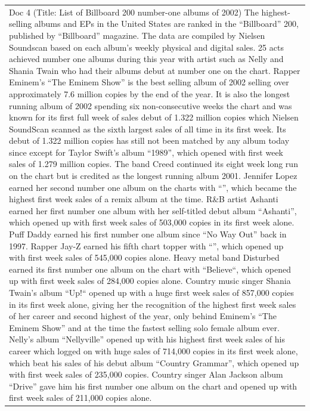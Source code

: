 \documentclass[11pt]{article}
\begin{document}
\begin{longtable}{|p{}|}
Doc 4 (Title: List of Billboard 200 number-one albums of 2002) The highest-selling albums and EPs in the United States are ranked in the ``Billboard'' 200, published by ``Billboard'' magazine. The data are compiled by Nielsen Soundscan based on each album's weekly physical and digital sales. 25 acts achieved number one albums during this year with artist such as Nelly and Shania Twain who had their albums debut at number one on the chart. Rapper Eminem's ``The Eminem Show'' is the best selling album of 2002 selling over approximately 7.6 million copies by the end of the year. It is also the longest running album of 2002 spending six non-consecutive weeks the chart and was known for its first full week of sales debut of 1.322 million copies which Nielsen SoundScan scanned as the sixth largest sales of all time in its first week. Its debut of 1.322 million copies has still not been matched by any album today since except for Taylor Swift's album ``1989'', which opened with first week sales of 1.279 million copies. The band Creed continued its eight week long run on the chart but is credited as the longest running album 2001. Jennifer Lopez earned her second number one album on the charts with ``'', which became the highest first week sales of a remix album at the time. R\&B artist Ashanti earned her first number one album with her self-titled debut album ``Ashanti'', which opened up with first week sales of 503,000 copies in its first week alone. Puff Daddy earned his first number one album since ``No Way Out'' back in 1997. Rapper Jay-Z earned his fifth chart topper with ``'', which opened up with first week sales of 545,000 copies alone. Heavy metal band Disturbed earned its first number one album on the chart with ``Believe``, which opened up with first week sales of 284,000 copies alone. Country music singer Shania Twain's album ``Up!`` opened up with a huge first week sales of 857,000 copies in its first week alone, giving her the recognition of the highest first week sales of her career and second highest of the year, only behind Eminem's ``The Eminem Show'' and at the time the fastest selling solo female album ever. Nelly's album ``Nellyville'' opened up with his highest first week sales of his career which logged on with huge sales of 714,000 copies in its first week alone, which beat his sales of his debut album ``Country Grammar'', which opened up with first week sales of 235,000 copies. Country singer Alan Jackson album ``Drive'' gave him his first number one album on the chart and opened up with first week sales of 211,000 copies alone.\\

\end{longtable}
\end{document}
